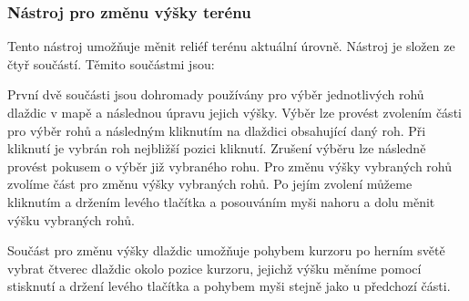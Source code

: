 \subsubsection{Nástroj pro změnu výšky terénu}
Tento nástroj umožňuje měnit reliéf terénu aktuální úrovně. Nástroj je složen ze čtyř součástí. Těmito součástmi jsou:

\medskip
{}

\medskip
{}

\medskip
{}

\medskip
{}
\bigskip


První dvě součásti jsou dohromady používány pro výběr jednotlivých rohů dlaždic v mapě a následnou úpravu jejich výšky. Výběr lze provést zvolením části pro výběr rohů a následným kliknutím na dlaždici obsahující daný roh. Při kliknutí je vybrán roh nejbližší pozici kliknutí. Zrušení výběru lze následně provést pokusem o výběr již vybraného rohu. Pro změnu výšky vybraných rohů zvolíme část pro změnu výšky vybraných rohů. Po jejím zvolení můžeme kliknutím a držením levého tlačítka a posouváním myši nahoru a dolu měnit výšku vybraných rohů.

Součást pro změnu výšky dlaždic umožňuje pohybem kurzoru po herním světě vybrat čtverec dlaždic okolo pozice kurzoru, jejichž výšku měníme pomocí stisknutí a držení levého tlačítka a pohybem myši stejně jako u předchozí části.

